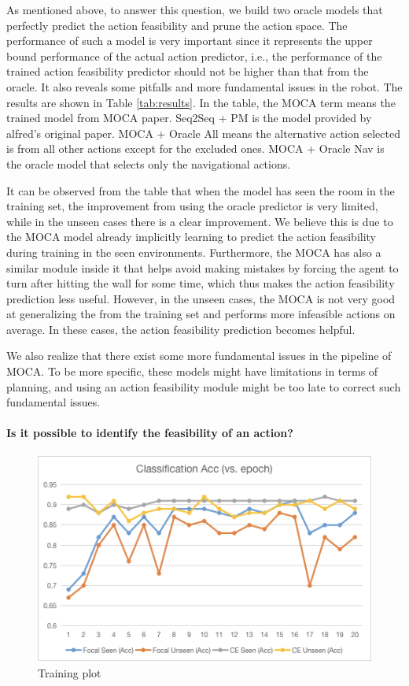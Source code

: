 \documentclass[11pt,a4paper]{article}
\begin{document}
As mentioned above, to answer this question, we build two oracle models that perfectly predict the action feasibility and prune the action space. The performance of such a model is very important since it represents the upper bound performance of the actual action predictor, i.e., the performance of the trained action feasibility predictor should not be higher than that from the oracle. It also reveals some pitfalls and more fundamental issues in the robot. The results are shown in Table \ref{tab:results}. In the table, the MOCA term means the trained model from MOCA paper. Seq2Seq + PM is the model provided by alfred's original paper. MOCA + Oracle All means the alternative action selected is from all other actions except for the excluded ones. MOCA + Oracle Nav is the oracle model that selects only the navigational actions. 

It can be observed from the table that when the model has seen the room in the training set, the improvement from using the oracle predictor is very limited, while in the unseen cases there is a clear improvement. We believe this is due to the MOCA model already implicitly learning to predict the action feasibility during training in the seen environments. Furthermore, the MOCA has also a similar module inside it that helps avoid making mistakes by forcing the agent to turn after hitting the wall for some time, which thus makes the action feasibility prediction less useful. However, in the unseen cases, the MOCA is not very good at generalizing the from the training set and performs more infeasible actions on average. In these cases, the action feasibility prediction becomes helpful.

We also realize that there exist some more fundamental issues in the pipeline of MOCA. To be more specific, these models might have limitations in terms of planning, and using an action feasibility module might be too late to correct such fundamental issues. 

\paragraph{Is it possible to identify the feasibility of an action?}

\begin{figure}
    \centering
    \includegraphics[width=\linewidth]{Fig0.png}
    \caption{Training plot}
    \label{fig:train_plot}
\end{figure}
\end{document}
